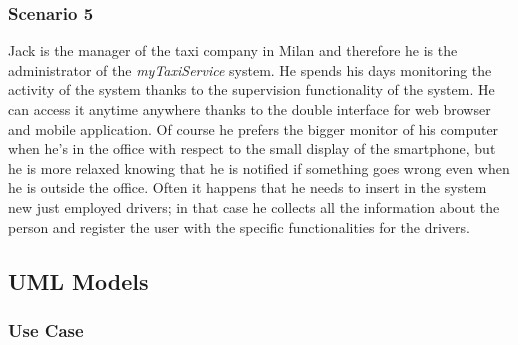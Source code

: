 \documentclass[a4paper,11pt]{report} %
\newcommand{\mts}{\mbox{\normalfont\itshape myTaxiService}}
\begin{document}
	\subsubsection{Scenario 5} Jack is the manager of the taxi company in Milan and therefore he is the administrator of the \mts{} system. He spends his days monitoring the activity of the system thanks to the supervision functionality of the system. He can access it anytime anywhere thanks to the double interface for web browser and mobile application. Of course he prefers the bigger monitor of his computer when he’s in the office with respect to the small display of the smartphone, but he is more relaxed knowing that he is notified if something goes wrong even when he is outside the office. Often it happens that he needs to insert in the system new just employed drivers; in that case he collects all the information about the person and register the user with the specific functionalities for the drivers.
	
	\pagebreak
	
	\subsection{UML Models}
	
	\subsubsection{Use Case}
	
%					
\end{document}
